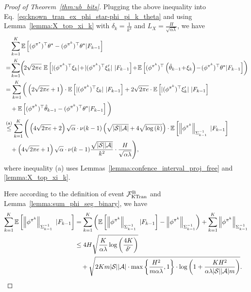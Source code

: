 \begin{proof}[Proof of Theorem~\ref{thm:ub_bits}]
	Plugging the above inequality into Eq.~\eqref{eq:known_tran_ex_phi_star-phi_pi_k_theta} and using Lemma~\ref{lemma:X_top_xi_k} with $\delta_k=\frac{1}{k^4}$ and $L_{X}=\frac{H}{\sqrt{\alpha \lambda}}$, we have
	\begin{align}
		&\quad \sum_{k=1}^{K} \ex\mbr{ (\phi^{\pi^*})^\top \theta^* - (\phi^{\pi^k})^\top \theta^* | F_{k-1} } 
		\nonumber\\
		&= \!\sum_{k=1}^{K}\! \bigg(\! 2\sqrt{2\pi e}\   \ex\mbr{ | (\phi^{\pi^k})^\top \xi_k | \!+\! | (\phi^{\pi^k})^\top \xi'_k| \ | F_{k-1} } \!+\! \ex\mbr{ (\phi^{\pi^k})^\top \sbr{\hat{\theta}_{k-1} \!+\! \xi_k} \!-\! (\phi^{\pi^k})^\top \theta^* | F_{k-1} } \!\bigg)
		\nonumber\\
		&= \sum_{k=1}^{K} \bigg( \sbr{2\sqrt{2\pi e} + 1} \cdot \ex\mbr{ | (\phi^{\pi^k})^\top \xi_k | \ | F_{k-1}} + 2\sqrt{2\pi e} \cdot \ex\mbr{ | (\phi^{\pi^k})^\top \xi'_k| \ | F_{k-1} } 
		\nonumber\\
		&\quad + \ex\mbr{ (\phi^{\pi^k})^\top \hat{\theta}_{k-1} - (\phi^{\pi^k})^\top \theta^* | F_{k-1} } \bigg)
		\nonumber\\
		&\overset{\textup{(a)}}{\leq} \sum_{k=1}^{K} \Bigg( \sbr{4\sqrt{2\pi e} + 2} \sqrt{\alpha} \cdot \nu(k-1) \sbr{ \sqrt{|\cS||\cA|} + 4 \sqrt{\log\sbr{k}} } \cdot \ex\mbr{ \nbr{ \phi^{\pi^k} }_{\Sigma_{k-1}^{-1}} \ | F_{k-1}} 
		\nonumber\\
		&\quad + \sbr{4\sqrt{2\pi e} + 1} \sqrt{\alpha} \cdot \nu(k-1)  \frac{\sqrt{|\cS| |\cA|}}{k^2}  \cdot \frac{H}{\sqrt{\alpha \lambda}} \Bigg) , \label{eq:ex_phi_star_theta_star-phi_k_theta_star}
	\end{align}
	where inequality (a) uses Lemmas~\ref{lemma:confence_interval_proj_free} and \ref{lemma:X_top_xi_k}.
	
	Here according to the definition of event $\mathcal{F}^{\textup{B}}_{\textup{KTran}}$ and Lemma~\ref{lemma:sum_phi_seg_binary}, we have
	\begin{align}
		\sum_{k=1}^{K} \mathbb{E}\left[  \left\|  \phi^{\pi^k}  \right\|_{\Sigma_{k-1}^{-1}} \ | F_{k-1} \right] &= \sum_{k=1}^{K} \left( \mathbb{E}\left[  \left\|  \phi^{\pi^k}  \right\|_{\Sigma_{k-1}^{-1}} \ | F_{k-1} \right] - \left\|  \phi^{\pi^k}  \right\|_{\Sigma_{k-1}^{-1}}  \right) + \sum_{k=1}^{K}  \left\|  \phi^{\pi^k}  \right\|_{\Sigma_{k-1}^{-1}}
		\nonumber\\
		&\leq 4H\sqrt{ \frac{K}{\alpha \lambda} \log\left( \frac{4K}{\delta'} \right) } 
		\nonumber\\
		&\quad + \sqrt{ 2Km |\mathcal{S}| |\mathcal{A}| \cdot \max\left\{  \frac{H^2}{m \alpha \lambda}, 1 \right\} \cdot \log \left(  1+ \frac{  KH^2 }{ \alpha \lambda |\mathcal{S}| |\mathcal{A}| m }  \right) } . \label{eq:ex_sum_phi_seg}
	\end{align}
	

\end{proof}
